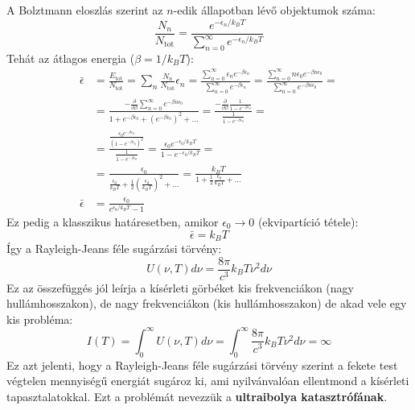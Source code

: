 \documentclass[a4paper,12pt]{article}
\begin{document}
A Bolztmann eloszlás szerint az $n$-edik állapotban lévő objektumok száma:
\begin{equation}
    \frac{N_n}{N_{\text{tot}}} = \frac{e^{-\epsilon_n / k_BT}}{ \sum_{n=0}^{\infty} e^{-\epsilon_n / k_BT}}
\end{equation}
Tehát az átlagos energia ($\beta = 1/k_BT$):
\begin{equation}
    \begin{aligned}
    \bar{\epsilon} &= \frac{E_{\text{tot}}}{N_{\text{tot}}} = \sum_{n} \frac{N_n}{N_{\text{tot}}} \epsilon_n = \frac{\sum_{n=0}^{\infty} \epsilon_n e^{-\beta \epsilon_n}}{\sum_{n=0}^{\infty} e^{-\beta \epsilon_n}} =  \frac{\sum_{n=0}^{\infty} n \epsilon_0 e^{-\beta n \epsilon_0}}{\sum_{n=0}^{\infty} e^{-\beta n \epsilon_0}} = \\
    &= \frac{-\frac{\partial}{\partial \beta }\sum_{n=0}^{\infty} e^{-\beta n \epsilon_0}}{1 + e^{-\beta \epsilon_0} + (e^{-\beta \epsilon_0})^2 + \ldots} = \frac{-\frac{\partial}{\partial \beta }\frac{1}{1 - e^{-\beta \epsilon_0}}}{\frac{1}{1 - e^{-\beta \epsilon_0}}} = \\
    &= \frac{\frac{\epsilon_0 e^{-\beta \epsilon_0}}{(1 - e^{-\beta \epsilon_0})^2}}{\frac{1}{1 - e^{-\beta \epsilon_0}}} = \frac{\epsilon_0 e^{-\epsilon_0 / k_BT}}{1 - e^{-\epsilon_0 / k_BT}} = \\
    &= \frac{\epsilon_0}{\frac{\epsilon_0}{k_BT} + \frac{1}{2} \left( \frac{\epsilon_0}{k_BT} \right)^2 + \ldots} = \frac{k_BT}{1 + \frac{1}{2} \frac{\epsilon_0}{k_BT} + \ldots} \\
    \bar{\epsilon} &= \frac{\epsilon_0}{e^{\epsilon_0 / k_BT} - 1}
    \end{aligned}
\end{equation}
Ez pedig a klasszikus határesetben, amikor $\epsilon_0 \to 0$ (ekvipartíció tétele):
\begin{equation}
    \bar{\epsilon} = k_BT
\end{equation}
Így a Rayleigh-Jeans féle sugárzási törvény:
\begin{equation}
    U(\nu, T) d\nu = \frac{8 \pi}{c^3} k_BT \nu^2 d\nu
\end{equation}
Ez az összefüggés jól leírja a kísérleti görbéket kis frekvenciákon (nagy hullámhosszakon), de nagy frekvenciákon (kis hullámhosszakon) de akad vele egy kis probléma:
\begin{equation}
    I(T) = \int_0^{\infty} U(\nu, T) d\nu = \int_0^{\infty} \frac{8 \pi}{c^3} k_BT \nu^2 d\nu = \infty
\end{equation}
Ez azt jelenti, hogy a Rayleigh-Jeans féle sugárzási törvény szerint a fekete test végtelen mennyiségű energiát sugároz ki, ami nyilvánvalóan ellentmond a kísérleti tapasztalatokkal. Ezt a problémát nevezzük a \textbf{ultraibolya katasztrófának}.
\end{document}
